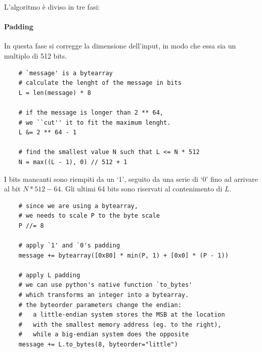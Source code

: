 L'algoritmo è diviso in tre fasi:

\paragraph{Padding}
In questa fase si corregge la dimensione dell'input, in modo che essa sia un multiplo di 512 bits.
\lstset{language=python}
\begin{lstlisting}
    # `message' is a bytearray
    # calculate the lenght of the message in bits
    L = len(message) * 8

    # if the message is longer than 2 ** 64,
    # we ``cut'' it to fit the maximum lenght.
    L &= 2 ** 64 - 1

    # find the smallest value N such that L <= N * 512
    N = max((L - 1), 0) // 512 + 1
\end{lstlisting}
I bits mancanti sono riempiti da un `1', seguito da una serie di `0' fino ad arrivare al bit $N * 512 - 64$. Gli ultimi 64 bits sono riservati al contenimento di $L$.
\begin{lstlisting}
    # since we are using a bytearray,
    # we needs to scale P to the byte scale
    P //= 8

    # apply `1' and `0's padding
    message += bytearray([0x80] * min(P, 1) + [0x0] * (P - 1))

    # apply L padding
    # we can use python's native function `to_bytes'
    # which transforms an integer into a bytearray.
    # the byteorder parameters change the endian:
    #   a little-endian system stores the MSB at the location 
    #   with the smallest memory address (eg. to the right),
    #   while a big-endian system does the opposite
    message += L.to_bytes(8, byteorder="little")
\end{lstlisting}


